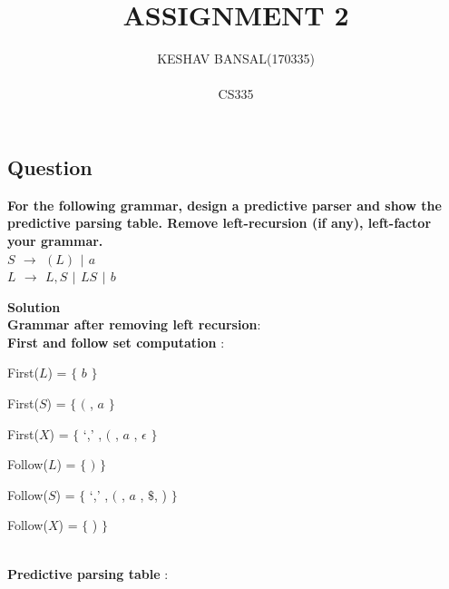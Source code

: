 \documentclass[12pt,fullpage]{exam}
\begin{document}
\title{ASSIGNMENT 2}%
\author{KESHAV BANSAL(170335)\\~\\%
CS335}
\date{}
\maketitle
\begin{questions}

\section*{Question}
\question \textbf{For the following grammar, design a predictive parser and show the predictive parsing table. Remove
left-recursion (if any), left-factor your grammar.\\
$S$ $\rightarrow$ $(L)$ $|$ $a$\\
$L$ $\rightarrow$ $L,S$ $|$ $LS$ $|$ $b$}


\textbf{Solution}\\

\textbf{Grammar after removing left recursion}:\\
\textbf{First and follow set computation} : 

First($L$) = $\{$  $b$   $\}$

First($S$) = $\{$ $($ , $a$  $\}$

First($X$) = $\{$ `,' , $($ , $a$ , $\epsilon$   $\}$

Follow($L$) = $\{$  $)$   $\}$

Follow($S$) = $\{$ `,' , $($ , $a$ , $\$$, )  $\}$

Follow($X$) = $\{$ ) $\}$\\~\\

\textbf{Predictive parsing table} :


\end{questions}
\end{document}
